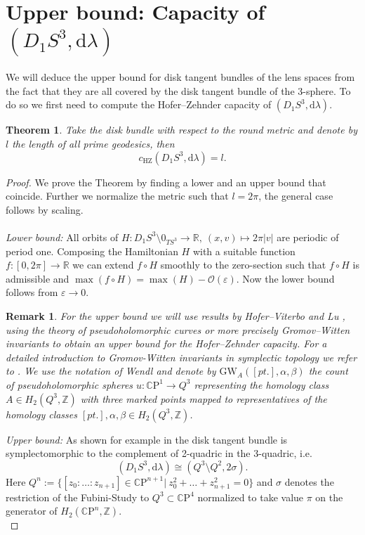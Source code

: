 \documentclass[12pt]{article}
\newtheorem{theorem}[Definition]{Theorem}
\newtheorem{Remark}[Definition]{Remark}
\newcommand{\cp}{\mathbb{C}\mathrm{P}}
\newcommand{\R}{\mathbb{R}} %
\newcommand{\Z}{\mathbb{Z}} %
\newcommand{\hz}{\mathrm{HZ}}
\newcommand{\dd}{\mathrm{d}}
\begin{document}
\section{Upper bound: Capacity of $(D_1S^3,\dd\lambda)$}
We will deduce the upper bound for disk tangent bundles of the lens spaces from the fact that they are all covered by the disk tangent bundle of the 3-sphere. To do so we first need to compute the Hofer--Zehnder capacity of $(D_1S^3,\dd\lambda)$.
\begin{theorem} Take the disk bundle with respect to the round metric and denote by $l$ the length of all prime geodesics, then
    $$c_{\hz}(D_1S^3,\dd\lambda)=l.$$
\end{theorem}
\begin{proof}
    We prove the Theorem by finding a lower and an upper bound that coincide. Further we normalize the metric such that $l=2\pi$, the general case follows by scaling.\\
    \ \\    
    \textit{Lower bound:} All orbits of $H: D_1S^3\setminus 0_{TS^3}\to\R,\ (x,v)\mapsto 2\pi\vert v\vert$ are periodic of period one. Composing the Hamiltonian $H$ with a suitable function $f:[0,2\pi]\to\R$ we can extend $f\circ H$ smoothly to the zero-section such that $f\circ H$ is admissible and $\max(f\circ H)=\max(H)-\mathcal{O}(\varepsilon)$. Now the lower bound follows from $\varepsilon\to 0$. 
\begin{Remark}
    For the upper bound we will use results by Hofer--Viterbo \cite{HV92} and Lu \cite{Lu06}, using the theory of pseudoholomorphic curves or more precisely Gromov--Witten invariants to obtain an upper bound for the Hofer--Zehnder capacity. For a detailed introduction to Gromov-Witten invariants in symplectic topology we refer to \cite{DS12}. We use the notation of Wendl \cite{Wdl18} and denote by $\mathrm{GW}_A([pt.],\alpha,\beta)$ the count of pseudoholomorphic spheres $u:\cp^1\to Q^3$ representing the homology class $A\in H_2(Q^3,\Z)$ with three marked points mapped to representatives of the homology classes $[pt.], \alpha,\beta \in H_2(Q^3,\Z)$. 
\end{Remark}
    \noindent
    \textit{Upper bound:}
    As shown for example in \cite[Lem.\ 3.2]{Ad22} the disk tangent bundle is symplectomorphic to the complement of 2-quadric in the 3-quadric, i.e.
    $$
    (D_1S^3,\dd\lambda)\cong (Q^3\setminus Q^2,2\sigma).
    $$
    Here $Q^n:=\lbrace [z_0:\ldots:z_{n+1}]\in \cp^{n+1}\vert \ z_0^2+\ldots +z_{n+1}^2=0\rbrace$ and $\sigma$ denotes the restriction of the Fubini-Study to $Q^3\subset \cp^4$ normalized to take value $\pi$ on the generator of $H_2(\cp^n,\Z)$.\\

\end{proof}
\end{document}
